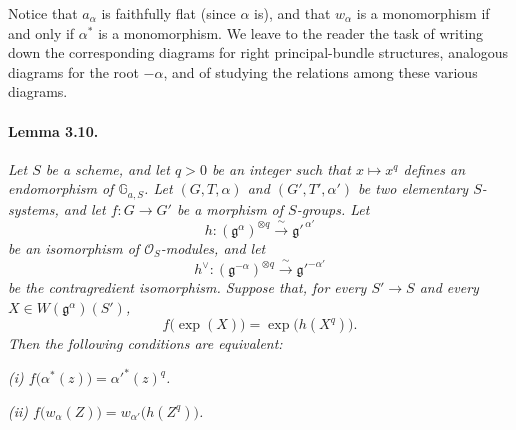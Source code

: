 \begin{center}
  \begin{minipage}{\textwidth}
  \centering

  \smallskip
  \end{minipage}
\end{center}

Notice that \(a_\alpha\) is faithfully flat (since \(\alpha\) is),
and that \(w_\alpha\) is a monomorphism if and only if
\(\alpha^\ast\) is a monomorphism.  We leave to the reader the task
of writing down the corresponding diagrams for right
principal-bundle structures, analogous diagrams for the root
\(-\alpha\), and of studying the relations among these various
diagrams.

\paragraph{\textbf{Lemma 3.10.}}
\emph{Let \(S\) be a scheme, and let \(q>0\) be an integer such that
\(x\mapsto x^q\) defines an endomorphism of \(\mathbb G_{a,S}\).
Let \((G,T,\alpha)\) and \((G',T',\alpha')\) be two elementary
\(S\)-systems, and let \(f\colon G\to G'\) be a morphism of
\(S\)-groups.  Let}
\[
  h\colon(\mathfrak g^\alpha)^{\otimes q}
    \xrightarrow{\ \sim\ }\mathfrak g'^{\,\alpha'}
\]
\emph{be an isomorphism of \(\mathcal O_S\)-modules, and let}
\[
  h^\vee\colon(\mathfrak g^{-\alpha})^{\otimes q}
    \xrightarrow{\ \sim\ }\mathfrak g'^{-\alpha'}
\]
\emph{be the contragredient isomorphism.  Suppose that, for every
\(S'\to S\) and every \(X\in W(\mathfrak g^\alpha)(S')\),}
\[
  f\bigl(\exp(X)\bigr)=\exp\bigl(h(X^q)\bigr).
\]
\emph{Then the following conditions are equivalent:}

\smallskip
\noindent\emph{\textup{(i)}
\(f\bigl(\alpha^\ast(z)\bigr)=\alpha'^\ast(z)^q\).}

\smallskip
\noindent\emph{\textup{(ii)}
\(f\bigl(w_\alpha(Z)\bigr)=w_{\alpha'}\bigl(h(Z^q)\bigr)\).}

